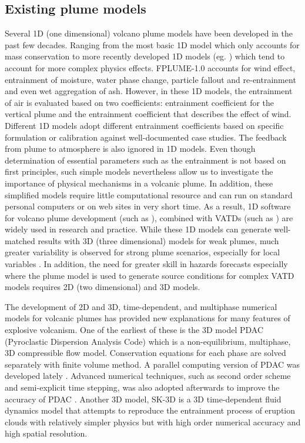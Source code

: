 \documentclass[journal abbreviation, manuscript]{copernicus}
\begin{document}
\subsection{Existing plume models}
Several 1D (one dimensional) volcano plume models have been developed in the past few decades. Ranging from the most basic 1D model \citep{woods1988fluid} which only accounts for mass conservation to more recently developed 1D models (eg. \citep{bursik2001effect, mastin2007user, degruyter2012improving, woodhouse2013interaction, devenish2013using, de2015plume, folch2016fplume, pouget2016sensitivity}) which tend to account for more complex physics effects. FPLUME-1.0 \citep{folch2016fplume} accounts for wind effect, entrainment of moisture, water phase change, particle fallout and re-entrainment and even wet aggregation of ash. However, in these 1D models, the entrainment of air is evaluated based on two coefficients: entrainment coefficient for the vertical plume and the entrainment coefficient that describes the effect of wind. Different 1D models adopt different entrainment coefficients based on specific formulation or calibration against well-documented case studies. The feedback from plume to atmosphere is also ignored in 1D models. Even though determination of essential parameters such as the entrainment is not based on first principles, such simple models nevertheless allow us to investigate the importance of physical mechanisms in a volcanic plume. In addition, these simplified models require little computational resource and can run on standard personal computers or on web sites in very short time. As a result, 1D software for volcano plume development (such as \citep{267, 1194, 3541}), combined with VATDs (such as \citep{114, draxler2015hysplit}) are widely used in research and practice. While these 1D models can generate well-matched results with 3D (three dimensional) models for weak plumes, much greater variability is observed for strong plume scenarios, especially for local variables \citep{costa2016results}. In addition, the need for greater skill in hazards forecasts especially where the plume model is used to generate source conditions for complex VATD models requires 2D (two dimensional) and 3D models.

The development of 2D and 3D, time-dependent, and multiphase numerical models for volcanic plumes has provided new explanations for many features of explosive volcanism. One of the earliest of these is the 3D model PDAC (Pyroclastic Dispersion Analysis Code) \citep{neri2003multiparticle}  which is a non-equilibrium, multiphase, 3D compressible flow model. Conservation equations for each phase are solved separately with finite volume method.  A parallel computing version of PDAC was developed lately \citep{ongaro2007parallel}. Advanced numerical techniques, such as second order scheme and semi-explicit time stepping, was also adopted afterwards to improve the accuracy of PDAC \citep{carcano2013semi}. 
Another 3D model, SK-3D \citep{suzuki2005numerical} is a 3D time-dependent fluid dynamics model that attempts to reproduce the entrainment process of eruption clouds with relatively simpler physics but with high order numerical accuracy and high spatial resolution.
\end{document}
